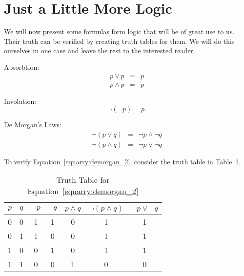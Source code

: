 \section{Just a Little More Logic}

We will now present some formulas form logic that will be of great use to us.  Their truth can be verified by creating truth tables for them.  We will do this ourselves in one case and leave the rest to the interested reader.

Absorbtion:
\begin{eqnarray}
	p \vee p & = & p \\
	p \wedge p & = & p
\end{eqnarray}

Involution: 
\begin{equation}
	\neg (\neg p) = p.
\end{equation}

De Morgan's Laws:
\begin{eqnarray}
	\neg (p\vee q) & = & \neg p \wedge \neg q  \\ \label{eqnarray:demorgan_1}
	\neg (p\wedge q) & = & \neg p \vee \neg q \label{eqnarry:demorgan_2}	
\end{eqnarray}

To verify Equation~\ref{eqnarry:demorgan_2}, consider the truth table in Table~\ref{table:demorgan_2}.


\begin{table}
	\begin{center}		
	\begin{tabular}{ccccccc}
		$p$ & $q$ & $\neg p$ & $\neg q$ & $p \wedge q$ & $\neg(p \wedge q)$ & $\neg p \vee \neg q$  \\ \hline 
		 0  & 0   &    1     &  1       &   0          &  1                 &    1                  \\
		 0  & 1   &    1     &  0       &   0          &  1                 &    1                  \\
		 1  & 0   &    0     &  1       &   0          &  1                 &    1                  \\
		 1  & 1   &    0     &  0       &   1          &  0                 &    0                  \\		 		 		 
	\end{tabular}
	\end{center} \caption{Truth Table for Equation~\ref{eqnarry:demorgan_2}}\label{table:demorgan_2}
\end{table}

